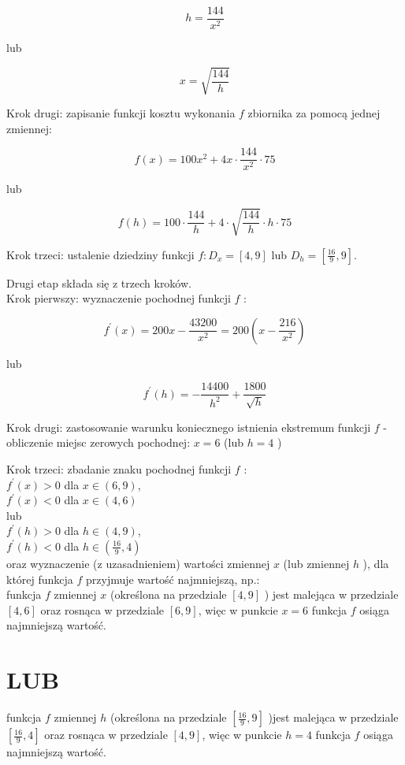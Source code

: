 \documentclass[10pt]{article}
\begin{document}
$$
h=\frac{144}{x^{2}}
$$

lub

$$
x=\sqrt{\frac{144}{h}}
$$

Krok drugi: zapisanie funkcji kosztu wykonania $f$ zbiornika za pomocą jednej zmiennej:

$$
f(x)=100 x^{2}+4 x \cdot \frac{144}{x^{2}} \cdot 75
$$

lub

$$
f(h)=100 \cdot \frac{144}{h}+4 \cdot \sqrt{\frac{144}{h}} \cdot h \cdot 75
$$

Krok trzeci: ustalenie dziedziny funkcji $f: D_{x}=[4,9]$ lub $D_{h}=\left[\frac{16}{9}, 9\right]$.

Drugi etap składa się z trzech kroków.\\
Krok pierwszy: wyznaczenie pochodnej funkcji $f$ :

$$
f^{\prime}(x)=200 x-\frac{43200}{x^{2}}=200\left(x-\frac{216}{x^{2}}\right)
$$

lub

$$
f^{\prime}(h)=-\frac{14400}{h^{2}}+\frac{1800}{\sqrt{h}}
$$

Krok drugi: zastosowanie warunku koniecznego istnienia ekstremum funkcji $f$ - obliczenie miejsc zerowych pochodnej: $x=6$ (lub $h=4$ )

Krok trzeci: zbadanie znaku pochodnej funkcji $f$ :\\
$f^{\prime}(x)>0$ dla $x \in(6,9)$,\\
$f^{\prime}(x)<0$ dla $x \in(4,6)$\\
lub\\
$f^{\prime}(h)>0$ dla $h \in(4,9)$,\\
$f^{\prime}(h)<0$ dla $h \in\left(\frac{16}{9}, 4\right)$\\
oraz wyznaczenie (z uzasadnieniem) wartości zmiennej $x$ (lub zmiennej $h$ ), dla której funkcja $f$ przyjmuje wartość najmniejszą, np.:\\
funkcja $f$ zmiennej $x$ (określona na przedziale $[4,9]$ ) jest malejąca w przedziale $[4,6]$ oraz rosnąca w przedziale $[6,9]$, więc w punkcie $x=6$ funkcja $f$ osiąga najmniejszą wartość.

\section*{LUB}
funkcja $f$ zmiennej $h$ (określona na przedziale $\left[\frac{16}{9}, 9\right]$ )jest malejąca w przedziale $\left[\frac{16}{9}, 4\right]$ oraz rosnąca w przedziale $[4,9]$, więc w punkcie $h=4$ funkcja $f$ osiąga najmniejszą wartość.
\end{document}
